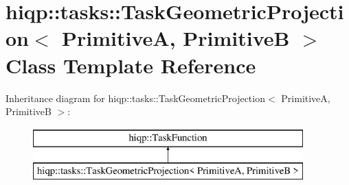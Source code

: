 \hypertarget{classhiqp_1_1tasks_1_1TaskGeometricProjection}{\section{hiqp\-:\-:tasks\-:\-:Task\-Geometric\-Projection$<$ Primitive\-A, Primitive\-B $>$ Class Template Reference}
\label{classhiqp_1_1tasks_1_1TaskGeometricProjection}
}
Inheritance diagram for hiqp\-:\-:tasks\-:\-:Task\-Geometric\-Projection$<$ Primitive\-A, Primitive\-B $>$\-:\begin{figure}[H]
\begin{center}
\leavevmode
\includegraphics[height=2.000000cm]{classhiqp_1_1tasks_1_1TaskGeometricProjection}
\end{center}
\end{figure}

